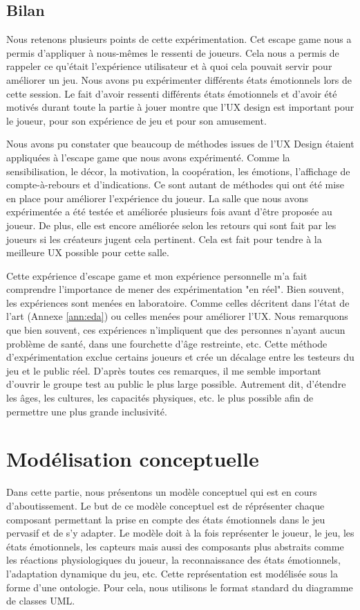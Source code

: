 \documentclass{article}
\begin{document}
	\subsection{Bilan}
		Nous retenons plusieurs points de cette expérimentation.
		Cet escape game nous a permis d'appliquer à nous-mêmes le ressenti de joueurs.
		Cela nous a permis de rappeler ce qu'était l'expérience utilisateur et à quoi cela pouvait servir pour améliorer un jeu.
		Nous avons pu expérimenter différents états émotionnels lors de cette session.
		Le fait d'avoir ressenti différents états émotionnels et d'avoir été motivés durant toute la partie à jouer montre que l'UX design est important pour le joueur, pour son expérience de jeu et pour son amusement.\par
		Nous avons pu constater que beaucoup de méthodes issues de l'UX Design étaient appliquées à l'escape game que nous avons expérimenté.
		Comme la sensibilisation, le décor, la motivation, la coopération, les émotions, l'affichage de compte-à-rebours et d'indications.
		Ce sont autant de méthodes qui ont été mise en place pour améliorer l'expérience du joueur. 
		La salle que nous avons expérimentée a été testée et améliorée plusieurs fois avant d'être proposée au joueur. 
		De plus, elle est encore améliorée selon les retours qui sont fait par les joueurs si les créateurs jugent cela pertinent.
		Cela est fait pour tendre à la meilleure UX possible pour cette salle.\par
		Cette expérience d'escape game et mon expérience personnelle m'a fait comprendre l'importance de mener des expérimentation "en réel".
		Bien souvent, les expériences sont menées en laboratoire.
		Comme celles décritent dans l'état de l'art (Annexe \ref{ann:eda}) ou celles menées pour améliorer l'UX.
		Nous remarquons que bien souvent, ces expériences n'impliquent que des personnes n'ayant aucun problème de santé, dans une fourchette d'âge restreinte, etc.
		Cette méthode d'expérimentation exclue certains joueurs et crée un décalage entre les testeurs du jeu et le public réel.
		D'après toutes ces remarques, il me semble important d'ouvrir le groupe test au public le plus large possible.
		Autrement dit, d'étendre les âges, les cultures, les capacités physiques, etc. le plus possible afin de permettre une plus grande inclusivité.

\section{Modélisation conceptuelle}\label{sec:modelisation}
	Dans cette partie, nous présentons un modèle conceptuel qui est en cours d'aboutissement. 
	Le but de ce modèle conceptuel est de réprésenter chaque composant permettant la prise en compte des états émotionnels dans le jeu pervasif et de s'y adapter. 
	Le modèle doit à la fois représenter le joueur, le jeu, les états émotionnels, les capteurs mais aussi des composants plus abstraits comme les réactions physiologiques du joueur, la reconnaissance des états émotionnels, l'adaptation dynamique du jeu, etc. 
	Cette représentation est modélisée sous la forme d'une ontologie.
	Pour cela, nous utilisons le format standard du diagramme de classes UML.
\end{document}
